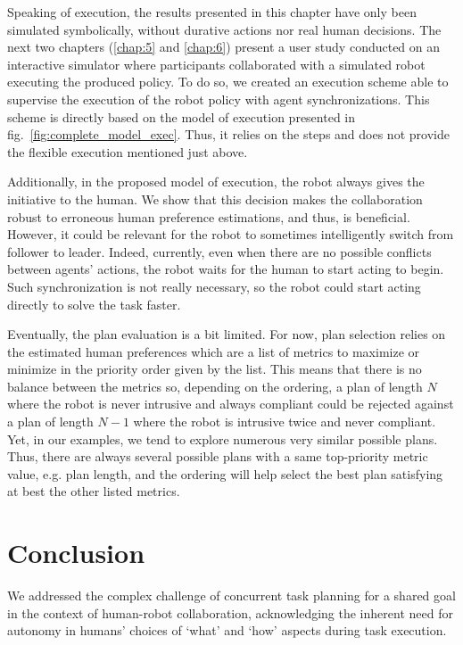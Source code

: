 Speaking of execution, the results presented in this chapter have only been simulated symbolically, without durative actions nor real human decisions. The next two chapters (\ref{chap:5} and \ref{chap:6}) present a user study conducted on an interactive simulator where participants collaborated with a simulated robot executing the produced policy. To do so, we created an execution scheme able to supervise the execution of the robot policy with agent synchronizations. This scheme is directly based on the model of execution presented in fig.~\ref{fig:complete_model_exec}. Thus, it relies on the steps and does not provide the flexible execution mentioned just above. 

Additionally, in the proposed model of execution, the robot always gives the initiative to the human. We show that this decision makes the collaboration robust to erroneous human preference estimations, and thus, is beneficial. However, it could be relevant for the robot to sometimes intelligently switch from follower to leader. Indeed, currently, even when there are no possible conflicts between agents' actions, the robot waits for the human to start acting to begin. Such synchronization is not really necessary, so the robot could start acting directly to solve the task faster. 

Eventually, the plan evaluation is a bit limited. For now, plan selection relies on the estimated human preferences which are a list of metrics to maximize or minimize in the priority order given by the list. This means that there is no balance between the metrics so, depending on the ordering, a plan of length $N$ where the robot is never intrusive and always compliant could be rejected against a plan of length $N-1$ where the robot is intrusive twice and never compliant. 
Yet, in our examples, we tend to explore numerous very similar possible plans. Thus, there are always several possible plans with a same top-priority metric value, e.g. plan length, and the ordering will help select the best plan satisfying at best the other listed metrics.   

\section{Conclusion}

We addressed the complex challenge of concurrent task planning for a shared goal in the context of human-robot collaboration, acknowledging the inherent need for autonomy in humans' choices of `what' and `how' aspects during task execution. 

